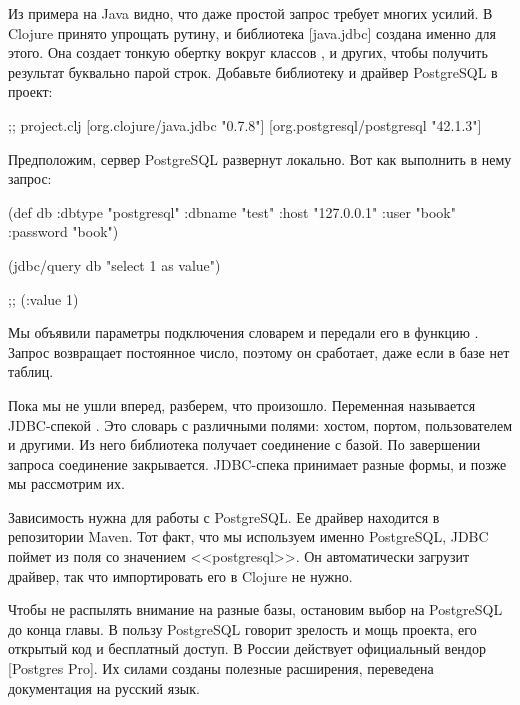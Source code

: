 Из примера на Java видно, что даже простой запрос требует многих усилий. В Clojure принято упрощать рутину, и библиотека [java.jdbc] создана именно для этого. Она создает тонкую обертку вокруг классов ,  и других, чтобы получить результат буквально парой строк. Добавьте библиотеку и драйвер PostgreSQL в проект:

\begin{english}
  \begin{clojure}
;; project.clj
[org.clojure/java.jdbc "0.7.8"]
[org.postgresql/postgresql "42.1.3"]
  \end{clojure}
\end{english}

Предположим, сервер PostgreSQL развернут локально. Вот как выполнить в нему запрос:

\begin{english}
  \begin{clojure/lines}
(def db {:dbtype "postgresql"
         :dbname "test"
         :host "127.0.0.1"
         :user "book"
         :password "book"})

(jdbc/query db "select 1 as value")

;; ({:value 1})
  \end{clojure/lines}
\end{english}

Мы объявили параметры подключения словарем и передали его в функцию . Запрос возвращает постоянное число, поэтому он сработает, даже если в базе нет таблиц.

Пока мы не ушли вперед, разберем, что произошло. Переменная  называется JDBC-спекой . Это словарь с различными полями: хостом, портом, пользователем и другими. Из него библиотека получает соединение с базой. По завершении запроса соединение закрывается. JDBC-спека принимает разные формы, и позже мы рассмотрим их.

\def\urlpgpro{https://postgrespro.ru}

Зависимость  нужна для работы с PostgreSQL. Ее драйвер находится в репозитории Maven. Тот факт, что мы используем именно PostgreSQL, JDBC поймет из поля  со значением <<postgresql>>. Он автоматически загрузит драйвер, так что импортировать его в Clojure не нужно.

Чтобы не распылять внимание на разные базы, остановим выбор на PostgreSQL до конца главы. В пользу PostgreSQL говорит зрелость и мощь проекта, его открытый код и бесплатный доступ. В России действует официальный вендор \footurl{PostgresPro}{\urlpgpro}[Postgres Pro]. Их силами созданы полезные расширения, переведена документация на русский язык.

